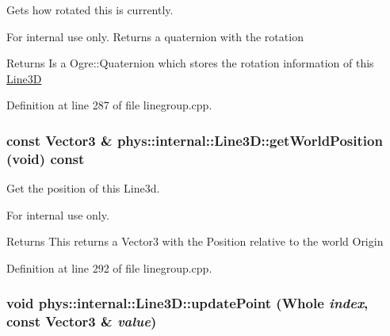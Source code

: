 Gets how rotated this is currently. 

\begin{DoxyInternal}{For internal use only.}
Returns a quaternion with the rotation \begin{DoxyReturn}{Returns}
Is a Ogre::Quaternion which stores the rotation information of this \hyperlink{classphys_1_1internal_1_1Line3D}{Line3D} 
\end{DoxyReturn}
\end{DoxyInternal}


Definition at line 287 of file linegroup.cpp.

\hypertarget{classphys_1_1internal_1_1Line3D_a2e81ac3696fedb22bd08688f7ecba2a8}{
\subsubsection[{getWorldPosition}]{\setlength{\rightskip}{0pt plus 5cm}const Vector3 \& phys::internal::Line3D::getWorldPosition (void) const}}
\label{d4/db5/classphys_1_1internal_1_1Line3D_a2e81ac3696fedb22bd08688f7ecba2a8}


Get the position of this Line3d. 

\begin{DoxyInternal}{For internal use only.}
\begin{DoxyReturn}{Returns}
This returns a Vector3 with the Position relative to the world Origin 
\end{DoxyReturn}
\end{DoxyInternal}


Definition at line 292 of file linegroup.cpp.

\hypertarget{classphys_1_1internal_1_1Line3D_a4b2dec1619e4456ab0cb034ad34eb9d1}{
\subsubsection[{updatePoint}]{\setlength{\rightskip}{0pt plus 5cm}void phys::internal::Line3D::updatePoint ({\bf Whole} {\em index}, \/  const Vector3 \& {\em value})}}
\label{d4/db5/classphys_1_1internal_1_1Line3D_a4b2dec1619e4456ab0cb034ad34eb9d1}


